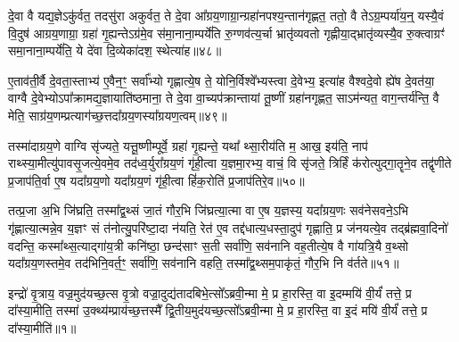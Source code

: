 दे॒वा वै यद्य॒ज्ञे\-ऽकु॑र्वत॒ तदसु॑रा अकुर्वत॒ ते दे॒वा आ᳚ग्रय॒णाग्रा॒न्ग्रहा॑नपश्य॒न्तान॑गृह्णत॒ ततो॒ वै ते\-ऽग्र॒म्पर्या॑य॒न्॒ यस्यै॒वं वि॒दुष॑ आग्रय॒णाग्रा॒ ग्रहा॑ गृ॒ह्यन्ते\-ऽग्र॑मे॒व स॑मा॒नाना॒म्पर्ये॑ति रु॒ग्णव॑त्य॒र्चा भ्रातृ॑व्यवतो गृह्णीया॒द्भ्रातृ॑व्यस्यै॒व रु॒क्त्वाग्रꣳ॑ समा॒नाना॒म्पर्ये॑ति॒ ये दे॑वा दि॒व्येका॑दश॒ स्थेत्या॑ह॥४८॥

ए॒ताव॑ती॒र्वै दे॒वता॒स्ताभ्य॑ ए॒वैन॒ꣳ॒ सर्वा᳚भ्यो गृह्णात्ये॒ष ते॒ योनि॒र्विश्वे᳚भ्यस्त्वा दे॒वेभ्य॒ इत्या॑ह वैश्वदे॒वो ह्ये॑ष दे॒वत॑या॒ वाग्वै दे॒वेभ्यो\-ऽपा᳚क्रामद्य॒ज्ञायाति॑ष्ठमाना॒ ते दे॒वा वा॒च्यप॑क्रान्तायां तू॒ष्णीं ग्रहा॑नगृह्णत॒ सा\-ऽम॑न्यत॒ वाग॒न्तर्य॑न्ति॒ वै मेति॒ साग्र॑य॒णम्प्रत्याग॑च्छ॒त्तदा᳚ग्रय॒णस्या᳚ग्रयण॒त्वम्॥४९॥

तस्मा॑दाग्रय॒णे वाग्वि सृ॑ज्यते॒ यत्तू॒ष्णीम्पूर्वे॒ ग्रहा॑ गृ॒ह्यन्ते॒ यथा᳚ थ्सा॒रीय॑ति म॒ आख॒ इय॑ति॒ नाप॑ राथ्स्या॒मीत्यु॑पावसृ॒जत्ये॒वमे॒व तद॑ध्व॒र्युरा᳚ग्रय॒णं गृ॑ही॒त्वा य॒ज्ञमा॒रभ्य॒ वाचं॒ वि सृ॑जते॒ त्रिर्\mbox{}हिं क॑रोत्युद्गा॒तॄने॒व तद्वृ॑णीते प्र॒जाप॑ति॒र्वा ए॒ष यदा᳚ग्रय॒णो यदा᳚ग्रय॒णं गृ॑ही॒त्वा हिं॑क॒रोति॑ प्र॒जाप॑तिरे॒व॥५०॥

तत्प्र॒जा अ॒भि जि॑घ्रति॒ तस्मा᳚द्व॒थ्सं जा॒तं गौर॒भि जि॑घ्रत्या॒त्मा वा ए॒ष य॒ज्ञस्य॒ यदा᳚ग्रय॒णः सव॑नेसवने॒\-ऽभि गृ॑ह्णात्या॒त्मन्ने॒व य॒ज्ञꣳ सं त॑नोत्यु॒परि॑ष्टा॒दा न॑यति॒ रेत॑ ए॒व तद्द॑धात्य॒धस्ता॒दुप॑ गृह्णाति॒ प्र ज॑नयत्ये॒व तद्ब्र॑ह्मवा॒दिनो॑ वदन्ति॒ कस्मा᳚थ्स॒त्याद्गा॑य॒त्री कनि॑ष्ठा॒ छन्द॑साꣳ स॒ती सर्वा॑णि॒ सव॑नानि वह॒तीत्ये॒ष वै गा॑यत्रि॒यै व॒थ्सो यदा᳚ग्रय॒णस्तमे॒व तद॑भिनि॒वर्त॒ꣳ॒ सर्वा॑णि॒ सव॑नानि वहति॒ तस्मा᳚द्व॒थ्सम॒पाकृ॑तं॒ गौर॒भि नि व॑र्तते॥५१॥

{\anuvakamend[{आ॒हा॒ग्र॒य॒ण॒त्वं प्र॒जाप॑तिरे॒वेति॑ विꣳश॒तिश्च॑॥11॥}]}


{}

\setcounter{anuvakam}{0}
इन्द्रो॑ वृ॒त्राय॒ वज्र॒मुद॑यच्छ॒त्स वृ॒त्रो वज्रा॒दुद्य॑तादबिभे॒त्सो᳚\-ऽब्रवी॒न्मा मे॒ प्र हा॒रस्ति॒ वा इ॒दम्मयि॑ वी॒र्यं॑ तत्ते॒ प्र दा᳚स्या॒मीति॒ तस्मा॑ उ॒क्थ्य॑म्प्राय॑च्छ॒त्तस्मै᳚ द्वि॒तीय॒मुद॑यच्छ॒त्सो᳚\-ऽब्रवी॒न्मा मे॒ प्र हा॒रस्ति॒ वा इ॒दं मयि॑ वी॒र्यं॑ तत्ते॒ प्र दा᳚स्या॒मीति॑॥१॥

